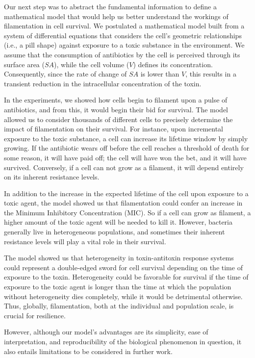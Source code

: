 \documentclass[
  12pt,
  a4paper,
  oneside]{krantz}
\begin{document}
Our next step was to abstract the fundamental information to define a
mathematical model that would help us better understand the workings of
filamentation in cell survival. We postulated a mathematical model built
from a system of differential equations that considers the cell's
geometric relationships (i.e., a pill shape) against exposure to a toxic
substance in the environment. We assume that the consumption of
antibiotics by the cell is perceived through its surface area (\(SA\)),
while the cell volume (\(V\)) defines its concentration. Consequently,
since the rate of change of \(SA\) is lower than \(V\), this results in a
transient reduction in the intracellular concentration of the toxin.

In the experiments, we showed how cells begin to filament upon a pulse
of antibiotics, and from this, it would begin their bid for survival.
The model allowed us to consider thousands of different cells to
precisely determine the impact of filamentation on their survival. For
instance, upon incremental exposure to the toxic substance, a cell can
increase its lifetime window by simply growing. If the antibiotic wears
off before the cell reaches a threshold of death for some reason, it
will have paid off; the cell will have won the bet, and it will have
survived. Conversely, if a cell can not grow as a filament, it will
depend entirely on its inherent resistance levels.

In addition to the increase in the expected lifetime of the cell upon
exposure to a toxic agent, the model showed us that filamentation could
confer an increase in the Minimum Inhibitory Concentration (MIC). So if
a cell can grow as filament, a higher amount of the toxic agent will be
needed to kill it. However, bacteria generally live in heterogeneous
populations, and sometimes their inherent resistance levels will play a
vital role in their survival.

The model showed us that heterogeneity in toxin-antitoxin response
systems could represent a double-edged sword for cell survival depending
on the time of exposure to the toxin. Heterogeneity could be favorable
for survival if the time of exposure to the toxic agent is longer than
the time at which the population without heterogeneity dies completely,
while it would be detrimental otherwise. Thus, globally, filamentation,
both at the individual and population scale, is crucial for resilience.

However, although our model's advantages are its simplicity, ease of
interpretation, and reproducibility of the biological phenomenon in
question, it also entails limitations to be considered in further work.
\end{document}
